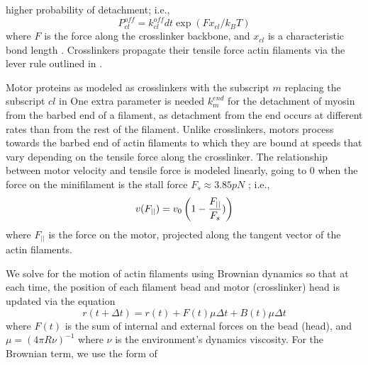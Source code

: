 \documentclass[12pt]{article}
\begin{document}
higher probability of detachment\cite{bell1978}; i.e.,
\begin{equation} 
  P_{cl}^{off} = k_{cl}^{off} dt\exp{\left(  F x_{cl}/k_B T\right)}  
  \label{eqn:cl_off}
\end{equation}
where $F$ is the force along the crosslinker backbone, and $x_{cl}$ is a
characteristic bond length \cite{stam2015}. 
Crosslinkers propagate their tensile force actin filaments via the lever rule outlined in 
\cite{nedelec2002, gordon2012, freedman2016}. 
\par
Motor proteins as modeled as crosslinkers  
with the subscript $m$ replacing the subscript $cl$ in 
One extra parameter is needed $k_m^{end}$ for the detachment of myosin from the
barbed end of a filament, as detachment from the end occurs at different rates 
than from the rest of the filament. 
Unlike crosslinkers, motors process towards the barbed end of actin filaments to which they are bound 
at speeds that vary depending on the tensile force along the crosslinker\cite{stam2015}.
The relationship between motor velocity and tensile force is modeled linearly, 
going to $0$ when the force on the minifilament is the stall force $F_s\approx 3.85pN$ \cite{nedelec2002, gordon2012}; i.e.,  
\begin{equation}  
  v(F_{||}) = v_0\left( 1-{F_{||}\over F_s}) \right)
    \label{eqn:myo_vel}
\end{equation} 
where $F_{||}$ is the force on the motor, projected along the tangent vector of the
actin filaments.
\par
We solve for the motion of actin filaments using Brownian dynamics so that at
each time, the position of each filament bead and motor (crosslinker) head is 
updated via the equation
\begin{equation}  
  r(t+\Delta t) = r(t) + F(t)\mu \Delta t + B(t) \mu \Delta t
\label{eqn:overdamped}
\end{equation}
where $F(t)$ is the sum of internal and external forces on the bead (head), 
and $\mu = (4\pi R\nu)^{-1}$ where $\nu$ is the environment's dynamics viscosity. 
For the Brownian term, we use the form of
\end{document}

